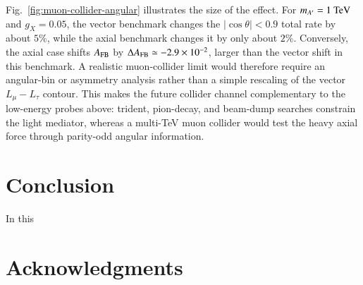 \documentclass[onecolumn, aps, nofootinbib, prd, preprint, floats, floatfix, amsmath, amssymb, superscriptaddress, preprintnumbers]{revtex4-1}
\begin{document}
Fig.~\ref{fig:muon-collider-angular} illustrates the size of the effect. For \(m_{A'}=1~{\rm TeV}\) and \(g_X=0.05\), the vector benchmark changes the \(|\cos\theta|<0.9\) total rate by about \(5\%\), while the axial benchmark changes it by only about \(2\%\). Conversely, the axial case shifts \(A_{\rm FB}\) by \(\Delta A_{\rm FB}\simeq-2.9\times10^{-2}\), larger than the vector shift in this benchmark. A realistic muon-collider limit would therefore require an angular-bin or asymmetry analysis rather than a simple rescaling of the vector \(L_\mu-L_\tau\) contour. This makes the future collider channel complementary to the low-energy probes above: trident, pion-decay, and beam-dump searches constrain the light mediator, whereas a multi-TeV muon collider would test the heavy axial force through parity-odd angular information.

\section{Conclusion}

In this


\section{Acknowledgments}




\end{document}
